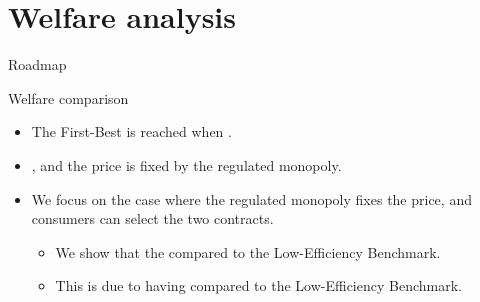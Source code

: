 \documentclass{class}
\begin{document}

\section{Welfare analysis}


\begin{frame}{Roadmap}
  \tableofcontents [sectionstyle=show/shaded,subsectionstyle=show/shaded]
\end{frame}


\begin{frame}{Welfare comparison}


\begin{itemize}
   
    \item The First-Best is reached when . \vfill

    \item {}, and the price is fixed by the regulated monopoly. \vfill


    \item We focus on the case where the regulated monopoly fixes the price, and consumers can select the two contracts. \vfill

    \begin{itemize}
        \item We show that the  compared to the Low-Efficiency Benchmark. \vfill
        \item This is due to having  compared to the Low-Efficiency Benchmark.
    \end{itemize}
    
\end{itemize}
    
\end{frame}

\end{document}
